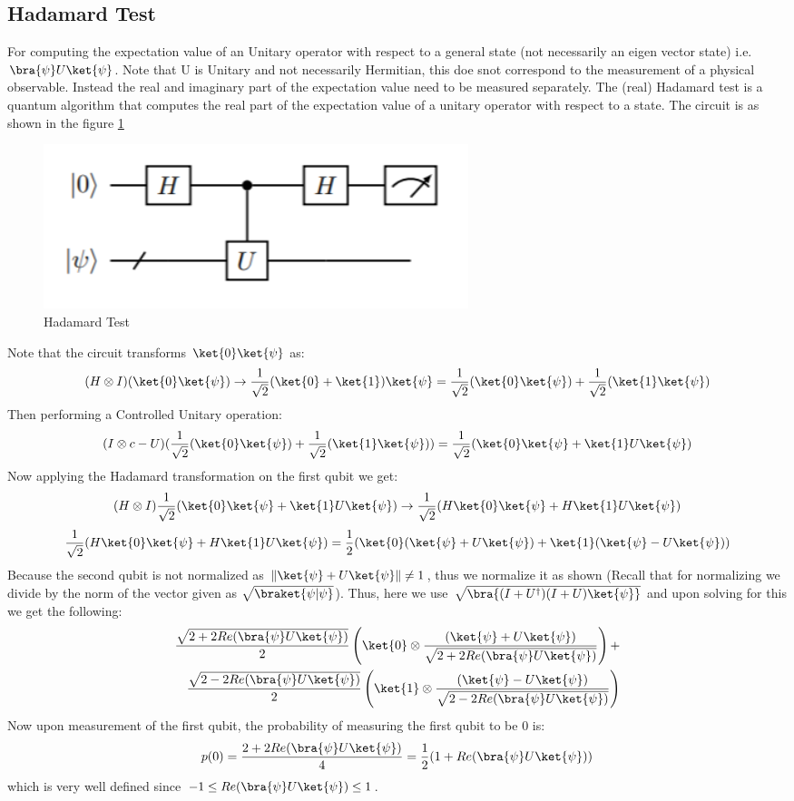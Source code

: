 \documentclass[12pt, oneside]{book}
\theoremstyle{definition}
\theoremstyle{definition}
\theoremstyle{remark}
\begin{document}
\subsection{Hadamard Test}
For computing the expectation value of an Unitary operator with respect to a general state (not necessarily an eigen vector state) i.e. $\bra{\psi}U\ket{\psi}$.
Note that U is Unitary and not necessarily Hermitian, this doe snot correspond to the measurement of a physical observable.
Instead the real and imaginary part of the expectation value need to be measured separately.
The (real) Hadamard test is a quantum algorithm that computes the real part of the expectation value of a unitary operator with respect to a state.
The circuit is as shown in the figure \ref{Hadamardtest}
\begin{figure}[H]
    \centering
    \includegraphics[width=0.6\textwidth]{../images/hadamardtest.png}
    \caption{Hadamard Test}
    \label{Hadamardtest}
\end{figure}
Note that the circuit transforms $\ket{0}\ket{\psi}$ as:
\[
(H\otimes I)(\ket{0}\ket{\psi})\rightarrow \frac{1}{\sqrt{2}}(\ket{0}+\ket{1})\ket{\psi}=\frac{1}{\sqrt{2}}(\ket{0}\ket{\psi}) +\frac{1}{\sqrt{2}}(\ket{1}\ket{\psi})
\]
Then performing a Controlled Unitary operation:
\[
(I\otimes c-U)(\frac{1}{\sqrt{2}}(\ket{0}\ket{\psi}) +\frac{1}{\sqrt{2}}(\ket{1}\ket{\psi}))=\frac{1}{\sqrt{2}}(\ket{0}\ket{\psi}+\ket{1}U\ket{\psi})
\]
Now applying the Hadamard transformation on the first qubit we get:
\[
(H\otimes I)\frac{1}{\sqrt{2}}(\ket{0}\ket{\psi}+\ket{1}U\ket{\psi})\rightarrow \frac{1}{\sqrt{2}}(H\ket{0}\ket{\psi}+H\ket{1}U\ket{\psi})
\]
\[
    \frac{1}{\sqrt{2}}(H\ket{0}\ket{\psi}+H\ket{1}U\ket{\psi})=\frac{1}{2}(\ket{0}(\ket{\psi}+U\ket{\psi})+\ket{1}(\ket{\psi}-U\ket{\psi}))
\]
Because the second qubit is not normalized as $\|\ket{\psi}+U\ket{\psi}\|\neq 1$, thus we normalize it as shown (Recall that for normalizing we divide by the norm of the vector given as $\sqrt{\braket{\psi|\psi}}$). Thus,
here we use $\sqrt{\bra{(I+U^{\dagger})(I+U)\ket{\psi}}}$ and upon solving for this we get the following: 
\begin{align*}
\frac{\sqrt{2+2Re(\bra{\psi}U\ket{\psi})}}{2}\left(\ket{0}\otimes \frac{(\ket{\psi}+U\ket{\psi})}{\sqrt{2+2Re(\bra{\psi}U\ket{\psi})}}\right)+&\\
\frac{\sqrt{2-2Re(\bra{\psi}U\ket{\psi})}}{2}\left(\ket{1}\otimes \frac{(\ket{\psi}-U\ket{\psi})}{\sqrt{2-2Re(\bra{\psi}U\ket{\psi})}}\right)
\end{align*}
Now upon measurement of the first qubit, the probability of measuring the first qubit to be 0 is:
\[
p(0)=\frac{2+2Re(\bra{\psi}U\ket{\psi})}{4}=\frac{1}{2}(1+Re(\bra{\psi}U\ket{\psi}))
\]
which is very well defined since $-1\leq Re(\bra{\psi}U\ket{\psi})\leq 1$.
\end{document}
